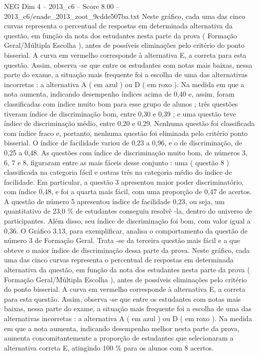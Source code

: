 \begin{textsample}{NEG Dim 4 – 2013\_c6 – Score 8.00 – 2013\_c6/enade\_2013\_zoot\_9cdde507ba.txt}
Neste gráfico, cada uma das cinco curvas representa o percentual de respostas em determinada alternativa da questão, em função da nota dos estudantes nesta parte da prova ( Formação Geral/Múltipla Escolha ), antes de possíveis eliminações pelo critério do ponto bisserial.
A curva em vermelho corresponde à alternativa E, a correta para esta questão.
Assim, observa -se que entre os estudantes com notas mais baixas, nessa parte do exame, a situação mais frequente foi a escolha de uma das alternativas incorretas : a alternativa A ( em azul ) ou D ( em roxo ).
Na medida em que a nota aumenta, indicando desempenho índices acima de 0,40 e, assim, foram classificadas com índice muito bom para esse grupo de alunos ; três questões tiveram índice de discriminação bom, entre 0,30 e 0,39 ; e uma questão teve índice de discriminação médio, entre 0,20 e 0,29.
Nenhuma questão foi classificada com índice fraco e, portanto, nenhuma questão foi eliminada pelo critério ponto bisserial.
O índice de facilidade variou de 0,23 a 0,96, e o de discriminação, de 0,25 a 0,48.
As questões com índice de discriminação muito bom, de números 3, 6, 7 e 8, figuraram entre as mais fáceis desse conjunto : uma ( questão 8 ) classificada na categoria fácil e outras três na categoria médio do índice de facilidade.
Em particular, a questão 3 apresentou maior poder discriminatório, com índice 0,48, e foi a quarta mais fácil, com uma proporção de 0,47 de acertos.
A questão de número 5 apresentou índice de facilidade 0,23, ou seja, um quantitativo de 23,0 \% de estudantes conseguiu resolvê -la, dentro do universo de participantes.
Além disso, seu índice de discriminação foi bom, com valor igual a 0,36.
O Gráfico 3.13, para exemplificar, analisa o comportamento da questão de número 3 de Formação Geral.
Trata -se da terceira questão mais fácil e a que obteve o maior índice de discriminação dessa parte da prova.
Neste gráfico, cada uma das cinco curvas representa o percentual de respostas em determinada alternativa da questão, em função da nota dos estudantes nesta parte da prova ( Formação Geral/Múltipla Escolha ), antes de possíveis eliminações pelo critério do ponto bisserial.
A curva em vermelho corresponde à alternativa E, a correta para esta questão.
Assim, observa -se que entre os estudantes com notas mais baixas, nessa parte do exame, a situação mais frequente foi a escolha de uma das alternativas incorretas : a alternativa A ( em azul ) ou D ( em roxo ).
Na medida em que a nota aumenta, indicando desempenho melhor nesta parte da prova, aumenta concomitantemente a proporção de estudantes que selecionaram a alternativa correta E, atingindo 100 \% para os alunos com 8 acertos.

\end{textsample}
